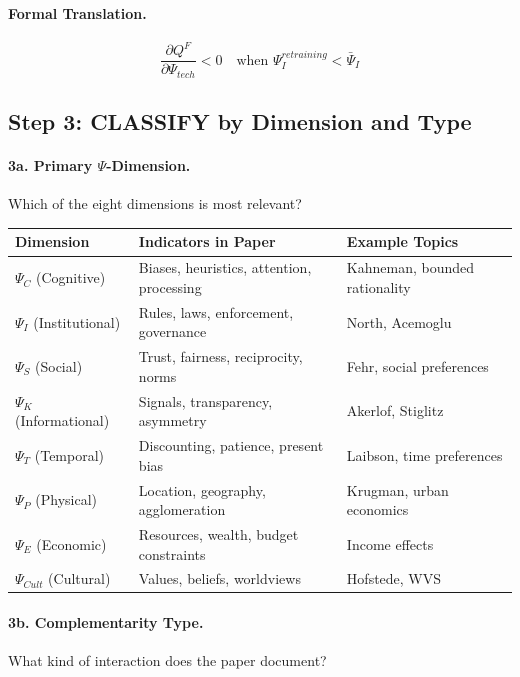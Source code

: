\paragraph{Formal Translation.}
\begin{equation}
\frac{\partial Q^F}{\partial \Psi_{tech}} < 0 \quad \text{when } \Psi_I^{retraining} < \bar{\Psi}_I
\end{equation}

\subsection{Step 3: CLASSIFY by Dimension and Type}

\paragraph{3a. Primary $\Psi$-Dimension.}
Which of the eight dimensions is most relevant?

\begin{center}
\renewcommand{\arraystretch}{1.2}
\begin{tabular}{|l|l|l|}
\hline
\textbf{Dimension} & \textbf{Indicators in Paper} & \textbf{Example Topics} \\
\hline
$\Psi_C$ (Cognitive) & Biases, heuristics, attention, processing & Kahneman, bounded rationality \\
$\Psi_I$ (Institutional) & Rules, laws, enforcement, governance & North, Acemoglu \\
$\Psi_S$ (Social) & Trust, fairness, reciprocity, norms & Fehr, social preferences \\
$\Psi_K$ (Informational) & Signals, transparency, asymmetry & Akerlof, Stiglitz \\
$\Psi_T$ (Temporal) & Discounting, patience, present bias & Laibson, time preferences \\
$\Psi_P$ (Physical) & Location, geography, agglomeration & Krugman, urban economics \\
$\Psi_E$ (Economic) & Resources, wealth, budget constraints & Income effects \\
$\Psi_{Cult}$ (Cultural) & Values, beliefs, worldviews & Hofstede, WVS \\
\hline
\end{tabular}
\end{center}

\paragraph{3b. Complementarity Type.}
What kind of interaction does the paper document?

